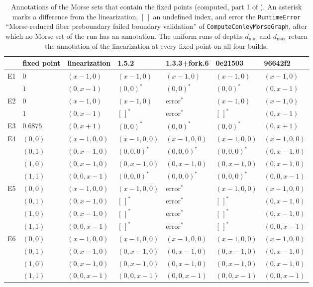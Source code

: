 \documentclass[11pt]{article}
\theoremstyle{plain}
\theoremstyle{definition}
\theoremstyle{remark}
\newcommand{\dmin}{d_{\min}}
\newcommand{\dmax}{d_{\max}}
\newcommand{\code}[1]{\texttt{#1}}
\newcommand{\undefidx}{[\,]}
\begin{document}
\begin{table}[tbp]
\centering
\caption{Annotations of the Morse sets that contain the fixed points (computed, part 1 of ). An asterisk marks a difference from the linearization, $\undefidx$ an undefined index, and error the \code{RuntimeError} ``Morse-reduced fiber preboundary failed boundary validation'' of \code{ComputeConleyMorseGraph}, after which no Morse set of the run has an annotation. The uniform runs of depths $\dmin$ and $\dmax$ return the annotation of the linearization at every fixed point on all four builds.}\label{tab:annotations}
\small
\begin{tabular}{lllllll}
\toprule
 & fixed point & linearization & 1.5.2 & 1.3.3+fork.6 & 0e21503 & 96642f2 \\
\midrule
E1 & $0$ & $(x-1,0)$ & $(x-1,0)$ & $(x-1,0)$ & $(x-1,0)$ & $(x-1,0)$ \\
 & $1$ & $(0,x-1)$ & $(0,0)^*$ & $(0,0)^*$ & $(0,0)^*$ & $(0,x-1)$ \\
E2 & $0$ & $(x-1,0)$ & $(x-1,0)$ & error$^*$ & $(x-1,0)$ & $(x-1,0)$ \\
 & $1$ & $(0,x-1)$ & $\undefidx^*$ & error$^*$ & $\undefidx^*$ & $(0,x-1)$ \\
E3 & $0.6875$ & $(0,x+1)$ & $(0,0)^*$ & $(0,0)^*$ & $(0,0)^*$ & $(0,x+1)$ \\
E4 & $(0,0)$ & $(x-1,0,0)$ & $(x-1,0,0)$ & $(x-1,0,0)$ & $(x-1,0,0)$ & $(x-1,0,0)$ \\
 & $(0,1)$ & $(0,x-1,0)$ & $(0,0,0)^*$ & $(0,0,0)^*$ & $(0,0,0)^*$ & $(0,x-1,0)$ \\
 & $(1,0)$ & $(0,x-1,0)$ & $(0,x-1,0)$ & $(0,x-1,0)$ & $(0,x-1,0)$ & $(0,x-1,0)$ \\
 & $(1,1)$ & $(0,0,x-1)$ & $(0,0,0)^*$ & $(0,0,0)^*$ & $(0,0,0)^*$ & $(0,0,x-1)$ \\
E5 & $(0,0)$ & $(x-1,0,0)$ & $(x-1,0,0)$ & error$^*$ & $(x-1,0,0)$ & $(x-1,0,0)$ \\
 & $(0,1)$ & $(0,x-1,0)$ & $\undefidx^*$ & error$^*$ & $\undefidx^*$ & $(0,x-1,0)$ \\
 & $(1,0)$ & $(0,x-1,0)$ & $\undefidx^*$ & error$^*$ & $\undefidx^*$ & $(0,x-1,0)$ \\
 & $(1,1)$ & $(0,0,x-1)$ & $\undefidx^*$ & error$^*$ & $\undefidx^*$ & $(0,0,x-1)$ \\
E6 & $(0,0)$ & $(x-1,0,0)$ & $(x-1,0,0)$ & $(x-1,0,0)$ & $(x-1,0,0)$ & $(x-1,0,0)$ \\
 & $(0,1)$ & $(0,x-1,0)$ & $(0,x-1,0)$ & $(0,x-1,0)$ & $(0,x-1,0)$ & $(0,x-1,0)$ \\
 & $(1,0)$ & $(0,x-1,0)$ & $(0,x-1,0)$ & $(0,x-1,0)$ & $(0,x-1,0)$ & $(0,x-1,0)$ \\
 & $(1,1)$ & $(0,0,x-1)$ & $(0,0,x-1)$ & $(0,0,x-1)$ & $(0,0,x-1)$ & $(0,0,x-1)$ \\
\bottomrule
\end{tabular}
\end{table}
\end{document}
